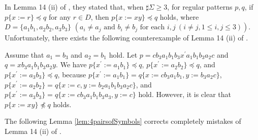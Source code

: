 In Lemma 14 (ii) of \cite{Sato1}, 
they stated that, when $\sharp \Sigma \geq 3$, for regular patterns $p,q$, if $p\{x:=r\}\preceq q$ for any $r\in D$, then $p\{x:=xy\} \preceq q$ holds, where 
$D = \{ a_{1}b_{1}, a_{2}b_{2}, a_{3}b_{3}\}$ $(a_{i} \ne a_{j} \mbox{ and } b_{i} \ne b_{j} \mbox{ for each } i,j~(i\ne j, 1\le i,j\le 3))$.
Unfortunately, there exists the following counterexample of Lemma 14 (ii) of \cite{Sato1}.
\begin{ex}\label{CounterExample_Lemma14}
Assume that $a_1 = b_3$ and $a_2 = b_1$ hold.
Let $p=cb_3a_1b_1b_3x^{\prime}a_1b_1b_3a_2c$ and $q=xb_3a_1b_1b_3a_2y$.
We have $p\{x^{\prime}:=a_1b_1\}\preceq q$, $p\{x^{\prime}:=a_2b_2\} \preceq q$, and $p\{x^{\prime}:=a_3b_3\} \preceq q$, 
because 
$p\{x^{\prime}:=a_1b_1\}=q\{x:=cb_3a_1b_1,y:=b_3a_2c\}$,
$p\{x^{\prime}:=a_2b_2\}=q\{x:=c,y:=b_2a_1b_1b_3a_2c\}$,
and $p\{x^{\prime}:=a_3b_3\}=q\{x:=cb_3a_1b_1b_3a_3,y:=c\}$ hold.
However, it is clear that $p\{x:=xy\} \not\preceq q$ holds.
\end{ex}

\noindent
The following Lemma \ref{lem:4pairsofSymbols} corrects completely mistakes of Lemma 14 (ii) of \cite{Sato1}.

